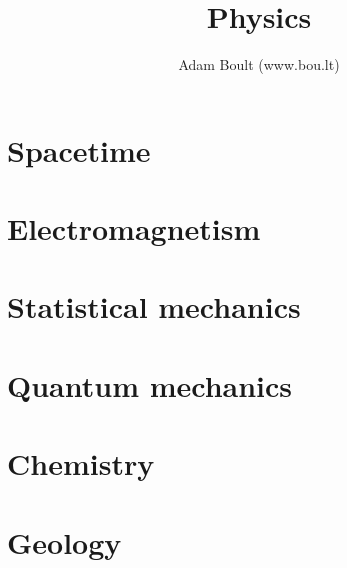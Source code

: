 \documentclass[oneside]{book}
\begin{document}
\author{Adam Boult (www.bou.lt)}
\title{Physics}
\maketitle

\setcounter{tocdepth}{1}
\tableofcontents



\part{Spacetime}







\part{Electromagnetism}


\part{Statistical mechanics}


\part{Quantum mechanics}




\part{Chemistry}







\part{Geology}

\end{document}
